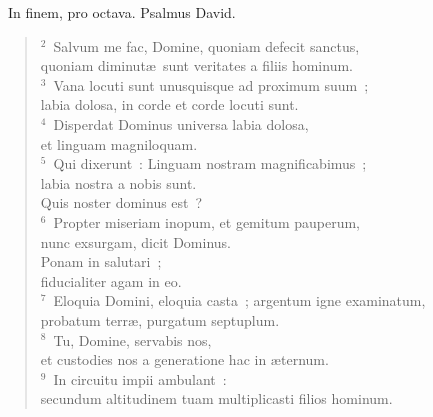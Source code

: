 ~\lettrine[lines=10,image=true,loversize=0.05,lraise=-0.03]{I}{}n finem, pro octava. Psalmus David.
\begin{flushleft}\begin{verse}\vspace{6pt}${}^{2}$~Salvum me fac, Domine, quoniam defecit sanctus,\\ quoniam diminut\ae\ sunt veritates a filiis hominum.\\
${}^{3}$~Vana locuti sunt unusquisque ad proximum suum~;\\ labia dolosa, in corde et corde locuti sunt.\\
${}^{4}$~Disperdat Dominus universa labia dolosa,\\ et linguam magniloquam.\\
${}^{5}$~Qui dixerunt~: Linguam nostram magnificabimus~;\\ labia nostra a nobis sunt.\\ Quis noster dominus est~?\\
${}^{6}$~Propter miseriam inopum, et gemitum pauperum,\\ nunc exsurgam, dicit Dominus.\\ Ponam in salutari~;\\ fiducialiter agam in eo.\\
${}^{7}$~Eloquia Domini, eloquia casta~; argentum igne examinatum,\\ probatum terr\ae , purgatum septuplum.\\
${}^{8}$~Tu, Domine, servabis nos,\\ et custodies nos a generatione hac in \ae ternum.\\
${}^{9}$~In circuitu impii ambulant~:\\ secundum altitudinem tuam multiplicasti filios hominum.\end{verse}\end{flushleft}


